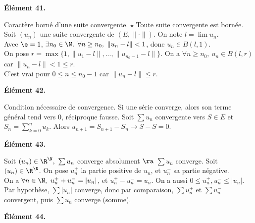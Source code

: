 \documentclass[11pt]{article}
\begin{document}
\bf{Élément 41.}

\begin{thm}{Caractère borné d'une suite convergente. $\star$}{}
    Toute suite convergente est bornée.
    \tcblower
    Soit $(u_n)$ une suite convergente de $(E,\|\cdot\|)$. On note $l=\lim u_n$.\\
    Avec $\e=1$, $\exists n_0\in\N, ~ \forall n \geq n_0, ~ \| u_n - l \| < 1$, donc $u_n \in B(l,1)$.\\
    On pose $r=\max \{1, \|u_1-l\|, ..., \|u_{n_0-1} - l\|\}$. On a $\forall n \geq n_0, ~ u_n \in B(l,r)$ car $\|u_n - l\| < 1 \leq r$.\\
    C'est vrai pour $0 \leq n \leq n_0 - 1$ car $\|u_n - l\| \leq r$.
\end{thm}

\bf{Élément 42.}

\begin{prop}{Condition nécessaire de convergence.}{}
    Si une série converge, alors son terme général tend vers 0, réciproque fausse.
    \tcblower
    Soit $\sum u_n$ convergente vers $S\in E$ et $S_n=\sum_{k=0}^nu_k$. Alors $u_{n+1}=S_{n+1}-S_n\to S-S = 0$.
\end{prop}

\vspace*{-0.4cm}

\bf{Élément 43.}

\begin{prop}{}{}
    Soit $(u_n)\in\R^\N, ~ \sum u_n$ converge absolument $\ra$ $\sum u_n$ converge.
    \tcblower
    Soit $(u_n)\in\R^\N$. On pose $u_n^+$ la partie positive de $u_n$, et $u_n^-$ sa partie négative.\\
    On a $\forall n \in \N, ~ u_n^+ + u_n^- = |u_n|$, et $u_n^+-u_n^-=u_n$. On a aussi $0\leq u_n^+,u_n^- \leq |u_n|$.\\
    Par hypothèse, $\sum |u_n|$ converge, donc par comparaison, $\sum u_n^+$ et $\sum u_n^-$ convergent, puis $\sum u_n$ converge (somme).
\end{prop}

\vspace*{-0.4cm}

\bf{Élément 44.}
\end{document}
